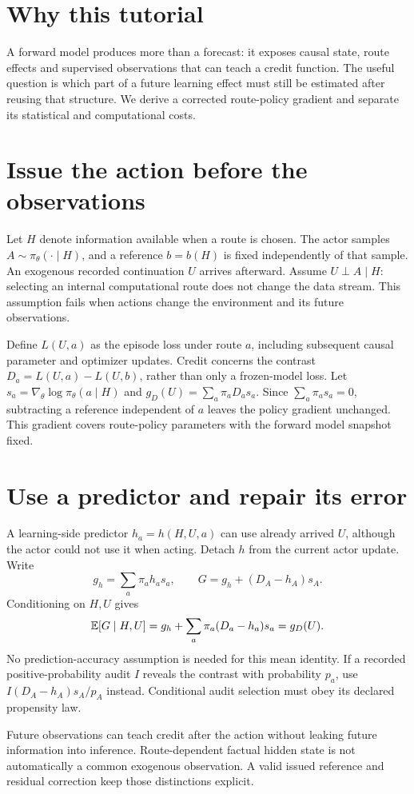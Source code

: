 \documentclass[11pt]{article}
\begin{document}
\section*{Why this tutorial}
A forward model produces more than a forecast: it exposes causal state, route effects and supervised observations that can teach a credit function. The useful question is which part of a future learning effect must still be estimated after reusing that structure. We derive a corrected route-policy gradient and separate its statistical and computational costs.
\section{Issue the action before the observations}
Let $H$ denote information available when a route is chosen. The actor samples $A\sim\pi_\theta(\cdot\mid H)$, and a reference $b=b(H)$ is fixed independently of that sample. An exogenous recorded continuation $U$ arrives afterward. Assume $U\perp A\mid H$: selecting an internal computational route does not change the data stream. This assumption fails when actions change the environment and its future observations.

Define $L(U,a)$ as the episode loss under route $a$, including subsequent causal parameter and optimizer updates. Credit concerns the contrast $D_a=L(U,a)-L(U,b)$, rather than only a frozen-model loss. Let $s_a=\nabla_\theta\log\pi_\theta(a\mid H)$ and $g_D(U)=\sum_a\pi_aD_as_a$. Since $\sum_a\pi_as_a=0$, subtracting a reference independent of $a$ leaves the policy gradient unchanged. This gradient covers route-policy parameters with the forward model snapshot fixed.
\section{Use a predictor and repair its error}
A learning-side predictor $h_a=h(H,U,a)$ can use already arrived $U$, although the actor could not use it when acting. Detach $h$ from the current actor update. Write
\[
 g_h=\sum_a\pi_ah_as_a,\qquad
 G=g_h+(D_A-h_A)s_A.
\]
Conditioning on $H,U$ gives
\[
 \mathbb{E}[G\mid H,U]=g_h+\sum_a\pi_a(D_a-h_a)s_a=g_D(U).
\]
No prediction-accuracy assumption is needed for this mean identity. If a recorded positive-probability audit $I$ reveals the contrast with probability $p_a$, use $I(D_A-h_A)s_A/p_A$ instead. Conditional audit selection must obey its declared propensity law.
\begin{keyidea}
Future observations can teach credit after the action without leaking future information into inference. Route-dependent factual hidden state is not automatically a common exogenous observation. A valid issued reference and residual correction keep those distinctions explicit.
\end{keyidea}
\newpage
\end{document}
